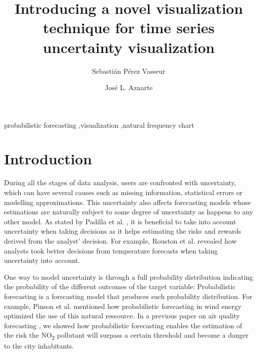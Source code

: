 \documentclass[a4paper,3p,sort&compress]{elsarticle}
\begin{document}
\linenumbers

\newcommand{\no}{NO\textsubscript{2}\xspace}
\newcommand{\ts}{\textsuperscript}

\begin{frontmatter}

  \title{Introducing a novel visualization technique for time series uncertainty visualization}


  \author{Sebasti\'an P\'erez Vasseur}
  \author{Jos\'e L. Aznarte}
  \address{Artificial Intelligence Department\\Universidad Nacional de
    Educaci\'on a Distancia --- UNED\\c/ Juan del Rosal, 16, Madrid, Spain}
  

\begin{abstract}
  
\end{abstract}

\begin{keyword}
probabilistic forecasting \sep visualization \sep natural frequency chart
\end{keyword}

\end{frontmatter}


\section{Introduction}
\label{sec:intro}

During all the stages of data analysis, users are confronted with uncertainty, which can have 
several causes such as missing information, statistical errors or modelling approximations.
This uncertainty also affects forecasting models whose estimations are naturally 
subject to some degree of uncertainty as happens to any other model. 
As stated by Padilla et al. \cite{padilla_uncertainty_2021}, it is beneficial to take into account uncertainty 
when taking decisions as it helps estimating the risks and rewards derived from the analyst'
decision. For example, Rouston et al. \cite{roulston_laboratory_2006} 
revealed how analysts 
took better decisions from temperature forecasts when taking uncertainty into account. 

One way to model uncertainty is through a full 
probability distribution indicating the probability of the different outcomes of the target variable:
Probabilistic forecasting is a forecasting model that produces such probability distribution.
For example, Pinson et al. \cite{pinson_non-parametric_2007} mentioned how probabilistic forecasting 
in wind energy optimized the use of this natural ressource. In a previous paper on air quality forecasting 
\cite{vasseur_comparing_2021}, we showed 
how probabilistic forecasting enables the estimation of the risk the \no pollutant will surpass a certain threshold 
and become a danger to the city inhabitants. 
\end{document}
